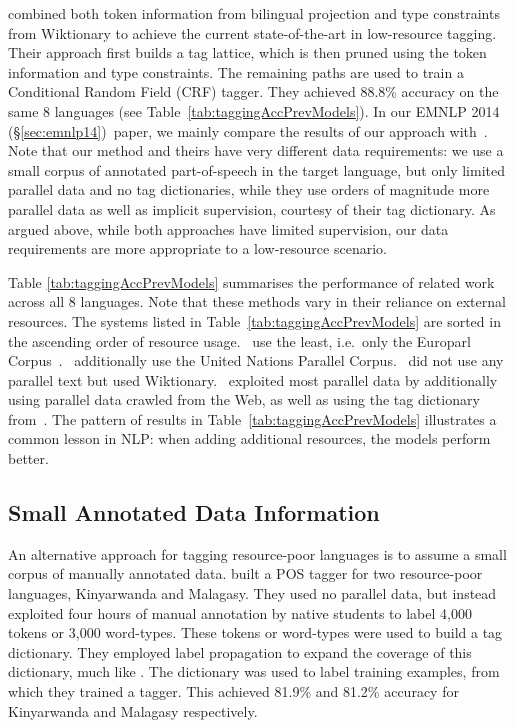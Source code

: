\documentclass[12pt,twoside,final,hidelinks]{ltthesis}
\theoremstyle{definition}
\newcommand\emnlpiv{EMNLP 2014 (\S\ref{sec:emnlp14})}
\begin{document}
 combined both token information from bilingual projection and type 
constraints from Wiktionary to achieve the current state-of-the-art in low-resource tagging. 
Their approach first builds a tag lattice, which is then pruned using the token information 
and type constraints. The remaining paths are used to train a Conditional Random Field (CRF) 
tagger. They achieved 88.8\% accuracy on the same 8 languages (see 
Table~\ref{tab:taggingAccPrevModels}). In our \emnlpiv\ paper, we mainly compare the 
results of our approach with~. Note that our method and theirs have 
very different data requirements: we use a small corpus of annotated part-of-speech in the 
target language, but only limited parallel data and no tag dictionaries, while they use orders 
of magnitude more parallel data as well as implicit supervision, courtesy of their tag 
dictionary. As argued above, while both approaches have limited supervision, our data 
requirements are more appropriate to a low-resource scenario. 

Table \ref{tab:taggingAccPrevModels} summarises the performance of related work across all 8 languages. Note that these methods vary in their reliance on external resources. The systems listed in Table~\ref{tab:taggingAccPrevModels} are sorted in the ascending order of resource usage.~ use the least, i.e.\ only the Europarl Corpus~\cite{europarl}.~ additionally use the United Nations Parallel Corpus.~ did not use any parallel text but used Wiktionary.~ exploited most parallel data by additionally using parallel data crawled from the Web, as well as 
using the tag dictionary from~. The pattern of results in Table~\ref{tab:taggingAccPrevModels} illustrates a common lesson in NLP: when adding additional resources, the models perform better.   
 
\subsection{Small Annotated Data Information}

An alternative approach for tagging resource-poor languages is to assume a small corpus of manually annotated data.  built a POS tagger for two resource-poor languages, Kinyarwanda and Malagasy. They used no parallel data, but instead exploited four hours of manual annotation by native students to label 4,000 tokens or 3,000 word-types. These tokens or word-types were used to build a tag dictionary. They employed label propagation to expand the coverage of this dictionary, much like . The dictionary was used to label training examples, from which they trained a tagger. This achieved 81.9\% and 81.2\% accuracy for Kinyarwanda and Malagasy respectively. %
 
\end{document}
